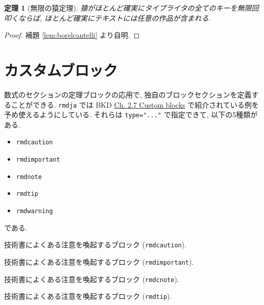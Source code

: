 \documentclass[
  nomag]{bxjsbook}
\makeatletter
\providecommand{\tightlist}{%
  \setlength{\itemsep}{0pt}\setlength{\parskip}{0pt}}
\newenvironment{kframe}{%
\medskip{}
\setlength{\fboxsep}{.8em}
 \def\at@end@of@kframe{}%
 \ifinner\ifhmode%
  \def\at@end@of@kframe{\end{minipage}}%
  \begin{minipage}{\columnwidth}%
 \fi\fi%
 \def\FrameCommand##1{\hskip\@totalleftmargin \hskip-\fboxsep
 \colorbox{shadecolor}{##1}\hskip-\fboxsep
     \hskip-\linewidth \hskip-\@totalleftmargin \hskip\columnwidth}%
 \MakeFramed {\advance\hsize-\width
   \@totalleftmargin\z@ \linewidth\hsize
   \@setminipage}}%
 {\par\unskip\endMakeFramed%
 \at@end@of@kframe}
\newenvironment{rmdblock}[1]
  {
  \begin{itemize}
  \renewcommand{\labelitemi}{
    \raisebox{-.7\height}[0pt][0pt]{
      {\setkeys{Gin}{width=3em,keepaspectratio}\texttt{[image: \_latex/\_img/\#1]}}
    }
  }
  \setlength{\fboxsep}{1em}
  \begin{kframe}
  \item
  }
  {
  \end{kframe}
  \end{itemize}
  }
\newenvironment{rmdnote}
  {\begin{rmdblock}{note}}
  {\end{rmdblock}}
\newenvironment{rmdcaution}
  {\begin{rmdblock}{caution}}
  {\end{rmdblock}}
\newenvironment{rmdimportant}
  {\begin{rmdblock}{important}}
  {\end{rmdblock}}
\newenvironment{rmdtip}
  {\begin{rmdblock}{tip}}
  {\end{rmdblock}}
\newtheorem{theorem}{定理}[chapter]
\theoremstyle{definition}
\theoremstyle{definition}
\theoremstyle{definition}
\theoremstyle{remark}
\makeatother
\begin{document}
\begin{theorem}[無限の猿定理]
\protect\hypertarget{thm:theorem1}{}{\label{thm:theorem1}
{}
}猿がほとんど確実にタイプライタの全てのキーを無限回叩くならば,
ほとんど確実にテキストには任意の作品が含まれる. \end{theorem}

\begin{proof}
{}補題 \ref{lem:borelcantelli} より自明.
\end{proof}

\hypertarget{ux30abux30b9ux30bfux30e0ux30d6ux30edux30c3ux30af}{%
\section{カスタムブロック}\label{ux30abux30b9ux30bfux30e0ux30d6ux30edux30c3ux30af}}

数式のセクションの定理ブロックの応用で,
独自のブロックセクションを定義することができる. \texttt{rmdja} では BKD
\href{https://bookdown.org/yihui/bookdown/custom-blocks.html}{Ch. 2.7
Custom blocks} で紹介されている例を予め使えるようにしている. それらは
\texttt{type="..."} で指定できて, 以下の5種類がある.

\begin{itemize}
\tightlist
\item
  \texttt{rmdcaution}
\item
  \texttt{rmdimportant}
\item
  \texttt{rmdnote}
\item
  \texttt{rmdtip}
\item
  \texttt{rmdwarning}
\end{itemize}

である.

\begin{rmdcaution}
技術書によくある注意を喚起するブロック (\texttt{rmdcaution}).
\end{rmdcaution}

\begin{rmdimportant}
技術書によくある注意を喚起するブロック (\texttt{rmdimportant}).
\end{rmdimportant}

\begin{rmdnote}
技術書によくある注意を喚起するブロック (\texttt{rmdcnote}).
\end{rmdnote}

\begin{rmdtip}
技術書によくある注意を喚起するブロック (\texttt{rmdtip}).
\end{rmdtip}
\end{document}
